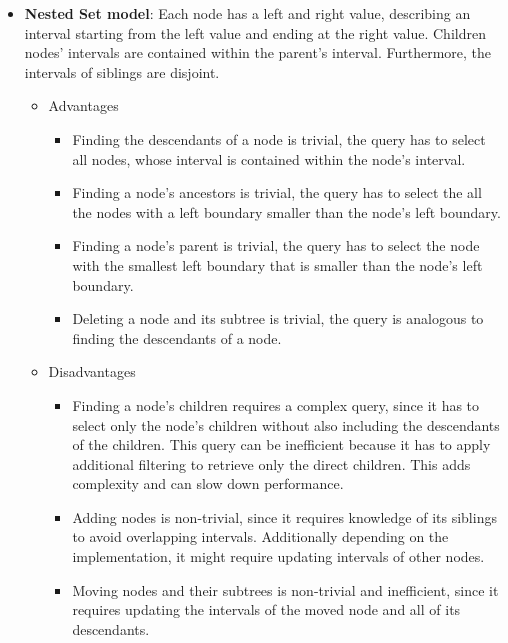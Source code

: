 \begin{itemize}[nolistsep]
	\item \textbf{Nested Set model}: Each node has a left and right value, describing an
	      interval starting from the left value and ending at the right value.
	      Children nodes' intervals are contained within the parent's interval. Furthermore, the
	      intervals of siblings are disjoint.
	      \begin{itemize}
		      \item Advantages
		            \begin{itemize}
			            \item Finding the descendants of a node is trivial, the query has to select all
			                  nodes, whose interval is contained within the node's interval.
			            \item Finding a node's ancestors is trivial, the query has to select the all the
			                  nodes with a left boundary smaller than the node's left boundary.
			            \item Finding a node's parent is trivial, the query has to select the node with
			                  the smallest left boundary that is smaller than the node's left boundary.
			            \item Deleting a node and its subtree is trivial, the query is analogous to finding
			                  the descendants of a node.
		            \end{itemize}
		      \item Disadvantages
		            \begin{itemize}
			            \item Finding a node's children requires a complex query, since it has to select
			                  only the node's children without also including the descendants of the
			                  children. This query can be inefficient because it has to apply additional filtering
			                  to retrieve only the direct children. This adds complexity and can slow down
			                  performance.
			            \item Adding nodes is non-trivial, since it requires knowledge of its siblings to
			                  avoid overlapping intervals. Additionally depending on the implementation, it
			                  might require updating intervals of other nodes.
			            \item Moving nodes and their subtrees is non-trivial and inefficient, since it requires updating
			                  the intervals of the moved node and all of its descendants.

\end{itemize}
\end{itemize}
\end{itemize}
